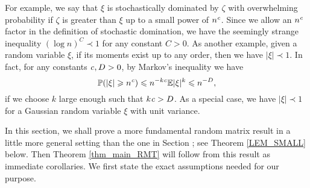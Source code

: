 For example, we say that $\xi$ is stochastically dominated by $\zeta$ with overwhelming probability if $\zeta$ is greater than $\xi$ up to a small power of $n^{{\mathit{c}}}$.
Since we allow an $n^{\mathit{c}}$ factor in the definition of stochastic domination, we have the seemingly strange inequality $(\log n)^C\prec 1$ for any constant $C>0$.
As another example, given a random variable $\xi$, if its moments exist up to any order, then we have $|\xi|\prec 1$. In fact, for any constants ${\mathit{c}}, D>0$, by Markov's inequality we have
$$ \mathbb{P}(|\xi|\geqslant n^{{\mathit{c}}})\leqslant n^{-k{\mathit{c}}}{\mathbb{E} |\xi|^k}\leqslant n^{-D},$$
if we choose $k$ large enough such that $k{\mathit{c}}>D$. As a special case, we have $|\xi|\prec 1$ for a Gaussian random variable $\xi$ with unit variance.



In this section, we shall prove a more fundamental random matrix result in a little more general setting than the one in Section ; see Theorem \ref{LEM_SMALL} below. %
 Then Theorem \ref{thm_main_RMT} will follow from this result as immediate corollaries. We first state the exact assumptions needed for our purpose.

